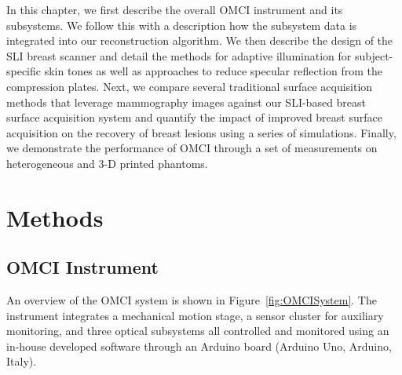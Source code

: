 In this chapter, we first describe the overall OMCI instrument and its subsystems. We follow this with a description how the subsystem data is integrated into our reconstruction algorithm. We then describe the design of the SLI breast scanner and detail the methods for adaptive illumination for subject-specific skin tones as well as approaches to reduce specular reflection from the compression plates. Next, we compare several traditional surface acquisition methods that leverage mammography images against our SLI-based breast surface acquisition system and quantify the impact of improved breast surface acquisition on the recovery of breast lesions using a series of simulations. Finally, we demonstrate the performance of OMCI through a set of measurements on heterogeneous and 3-D printed phantoms.



\section{Methods}
\label{chap:omci:methods}

\subsection{OMCI Instrument}
An overview of the OMCI system is shown in Figure~\ref{fig:OMCISystem}. The instrument integrates a mechanical motion stage, a sensor cluster for auxiliary monitoring, and three optical subsystems all controlled and monitored using an in-house developed software through an Arduino board (Arduino Uno, Arduino, Italy). 

